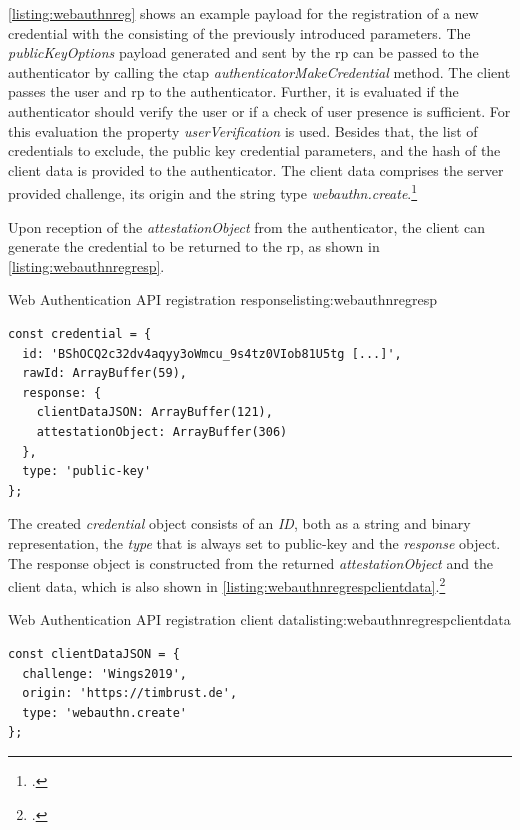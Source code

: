 \autoref{listing:webauthnreg} shows an example payload for the registration of a new credential with the \wa{} consisting of the previously introduced parameters. The \textit{publicKeyOptions} payload generated and sent by the \gls{rp} can be passed to the authenticator by calling the \gls{ctap} \textit{authenticatorMakeCredential} method. The client passes the user and \gls{rp} to the authenticator. Further, it is evaluated if the authenticator should verify the user or if a check of user presence is sufficient. For this evaluation the property \textit{userVerification} is used. Besides that, the list of credentials to exclude, the public key credential parameters, and the hash of the client data is provided to the authenticator. The client data comprises the server provided challenge, its origin and the string type \textit{webauthn.create}.\footcites[See][Chapter 5.4, 6.4.2]{w3c}

Upon reception of the \textit{attestationObject} from the authenticator, the client can generate the credential to be returned to the \gls{rp}, as shown in \autoref{listing:webauthnregresp}.
\\
\begin{example}{Web Authentication API registration response}{listing:webauthnregresp}
\begin{verbatim}
const credential = {
  id: 'BShOCQ2c32dv4aqyy3oWmcu_9s4tz0VIob81U5tg [...]',
  rawId: ArrayBuffer(59),
  response: {
    clientDataJSON: ArrayBuffer(121),
    attestationObject: ArrayBuffer(306)
  },
  type: 'public-key'
};
\end{verbatim}
\end{example}

The created \textit{credential} object consists of an \textit{ID}, both as a string and binary representation, the \textit{type} that is always set to \frqq public-key\flqq{} and the \textit{response} object. The response object is constructed from the returned \textit{attestationObject} and the client data, which is also shown in \autoref{listing:webauthnregrespclientdata}.\footcite[See][Chapter 5.1]{w3c}
\\
\begin{example}{Web Authentication API registration client data}{listing:webauthnregrespclientdata}
\begin{verbatim}
const clientDataJSON = {
  challenge: 'Wings2019',
  origin: 'https://timbrust.de',
  type: 'webauthn.create'
};
\end{verbatim}
\end{example}

